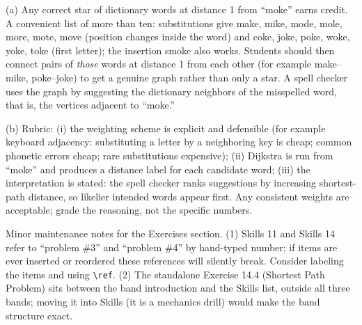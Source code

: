 (a) Any correct star of dictionary words at distance 1 from ``moke'' earns credit. A convenient list of more than ten: substitutions give make, mike, mode, mole, more, mote, move (position changes inside the word) and coke, joke, poke, woke, yoke, toke (first letter); the insertion smoke also works. Students should then connect pairs of \emph{those} words at distance 1 from each other (for example make--mike, poke--joke) to get a genuine graph rather than only a star. A spell checker uses the graph by suggesting the dictionary neighbors of the misspelled word, that is, the vertices adjacent to ``moke.''

(b) Rubric: (i) the weighting scheme is explicit and defensible (for example keyboard adjacency: substituting a letter by a neighboring key is cheap; common phonetic errors cheap; rare substitutions expensive); (ii) Dijkstra is run from ``moke'' and produces a distance label for each candidate word; (iii) the interpretation is stated: the spell checker ranks suggestions by increasing shortest-path distance, so likelier intended words appear first. Any consistent weights are acceptable; grade the reasoning, not the specific numbers.

\begin{qaflag}
Minor maintenance notes for the Exercises section. (1) Skills 11 and Skills 14 refer to ``problem \#3'' and ``problem \#4'' by hand-typed number; if items are ever inserted or reordered these references will silently break. Consider labeling the items and using \texttt{\textbackslash ref}. (2) The standalone Exercise 14.4 (Shortest Path Problem) sits between the band introduction and the Skills list, outside all three bands; moving it into Skills (it is a mechanics drill) would make the band structure exact.
\end{qaflag}
